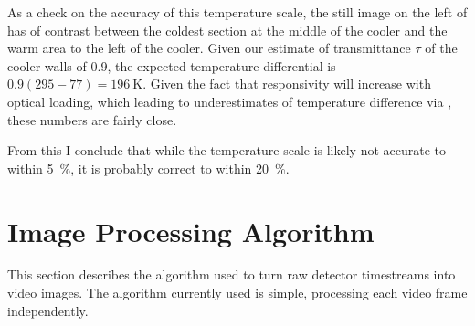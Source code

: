 As a check on the accuracy of this temperature scale, the still image on the left of  has  of contrast between the coldest section at the middle of the cooler and the warm area to the left of the cooler.
Given our estimate of transmittance $\tau$ of the cooler walls of \num{0.9}, the expected temperature differential is $0.9(295-77) = \SI{196}{\K}$.
Given the fact that responsivity will increase with optical loading, which leading to underestimates of temperature difference via , these numbers are fairly close.

From this I conclude that while the temperature scale is likely not accurate to within \SI{5}{\percent}, it is probably correct to within \SI{20}{\percent}.

\section{Image Processing Algorithm} \label{sec:ch8-algo}

This section describes the algorithm used to turn raw detector timestreams into video images.
The algorithm currently used is simple, processing each video frame independently.

